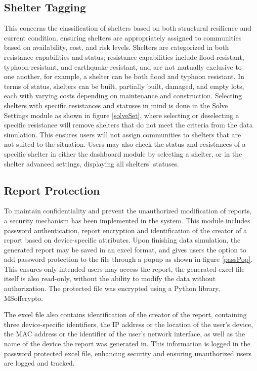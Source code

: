 \documentclass[12pt,a4paper,]{article}
\begin{document}
	\subsection{Shelter Tagging}
	This concerns the classification of shelters based on both structural resilience and current condition, ensuring shelters are appropriately assigned to communities based on availability, cost, and risk levels. Shelters are categorized in both resistance capabilities and status; resistance capabilities include flood-resistant, typhoon-resistant, and earthquake-resistant, and are not mutually exclusive to one another, for example, a shelter can be both flood and typhoon resistant. In terms of status, shelters can be built, partially built, damaged, and empty lots, each with varying costs depending on maintenance and construction.
	Selecting shelters with specific resistances and statuses in mind is done in the Solve Settings module as shown in figure \ref{solveSet}, where selecting or deselecting a specific resistance will remove shelters that do not meet the criteria from the data simulation. This ensures users will not assign communities to shelters that are not suited to the situation. Users may also check the status and resistances of a specific shelter in either the dashboard module by selecting a shelter, or in the shelter advanced settings, displaying all shelters’ statuses.
	\subsection{Report Protection}
	To maintain confidentiality and prevent the unauthorized modification of reports, a security mechanism has been implemented in the system. This module includes password authentication, report encryption and identification of the creator of a report based on device-specific attributes.
	Upon finishing data simulation, the generated report may be saved in an excel format, and gives users the option to add password protection to the file through a popup as shown in figure \ref{passPop}. This ensures only intended users may access the report, the generated excel file itself is also read-only, without the ability to modify the data without authorization. The protected file was encrypted using a Python library, MSoffcrypto.
	
	The excel file also contains identification of the creator of the report, containing three device-specific identifiers, the IP address or the location of the user’s device, the MAC address or the identifier of the user’s network interface, as well as the name of the device the report was generated in. This information is logged in the password protected excel file, enhancing security and ensuring unauthorized users are logged and tracked. 
\end{document}
